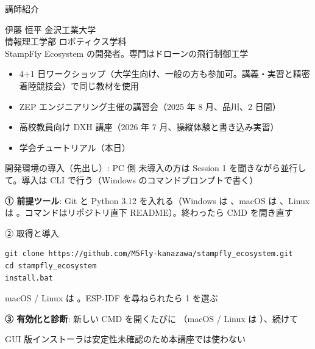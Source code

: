 \begin{frame}{講師紹介}
  \begin{block}{伊藤 恒平}
    \small 金沢工業大学\\
    情報理工学部 ロボティクス学科\\[3pt]
    StampFly Ecosystem の開発者。専門はドローンの飛行制御工学
  \end{block}

  \vspace{0.5em}

  \begin{itemize}\small
    \item 4+1 日ワークショップ（大学生向け、一般の方も参加可。講義・実習と精密着陸競技会）で同じ教材を使用
    \item ZEP エンジニアリング主催の講習会（2025 年 8 月、品川、2 日間）
    \item 高校教員向け DXH 講座（2026 年 7 月、操縦体験と書き込み実習）
    \item 学会チュートリアル（本日）
  \end{itemize}
\end{frame}

\begin{frame}[fragile]{開発環境の導入（先出し）: PC 側}
  {\small 未導入の方は Session 1 を聞きながら並行して。導入は CLI で行う（Windows のコマンドプロンプトで書く）}

  {\footnotesize \textbf{① 前提ツール}: Git と Python 3.12 を入れる（Windows は 、macOS は 、Linux は 。コマンドはリポジトリ直下 README）。終わったら CMD を開き直す}
  \begin{exampleblock}{② 取得と導入}
    \begin{lstlisting}[style=sfbash, numbers=none, aboveskip=1pt, belowskip=0pt]
git clone https://github.com/M5Fly-kanazawa/stampfly_ecosystem.git
cd stampfly_ecosystem
install.bat
    \end{lstlisting}
    \footnotesize macOS / Linux は 。ESP-IDF を尋ねられたら 1 を選ぶ
  \end{exampleblock}
  {\footnotesize \textbf{③ 有効化と診断}: 新しい CMD を開くたびに （macOS / Linux は ）、続けて }

  {\scriptsize GUI 版インストーラは安定性未確認のため本講座では使わない}
\end{frame}

